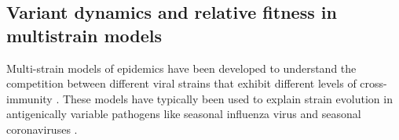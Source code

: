 \documentclass[12pt,oneside,letterpaper]{article}
\begin{document}
%



\subsection*{Variant dynamics and relative fitness in multistrain models}

Multi-strain models of epidemics have been developed to understand the competition between different viral strains that exhibit different levels of cross-immunity \cite{Gog2002, bedford2012canalization}.
These models have typically been used to explain strain evolution in antigenically variable pathogens like seasonal influenza virus \cite{bedford2014integrating} and seasonal coronaviruses \cite{Kistler2021, Eguia2021}.
\end{document}
